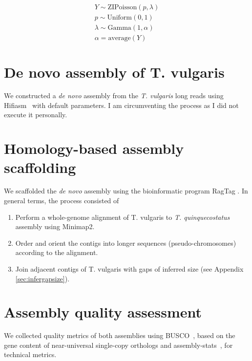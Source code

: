 \begin{subequations}
\label{eq:model}
\begin{align}
Y \sim \textrm{ZIPoisson}(p, \lambda) \label{eq:model1}\\
p \sim \textrm{Uniform}(0, 1) \label{eq:model2}\\
\lambda \sim \textrm{Gamma}(1, \alpha)  \label{eq:model3}\\
\alpha = \textrm{average}(Y) \label{eq:model4}
\end{align}   
\end{subequations}


\section{De novo assembly of T. vulgaris}\label{sec:denovo}

We constructed a \textit{de novo} assembly from the \textit{T. vulgaris} long reads using Hifiasm~\cite{chengHaplotyperesolvedNovoAssembly2021} with default parameters. I am circumventing the process as I did not execute it personally.
        
\section{Homology-based assembly scaffolding}\label{sec:scaffold}

We scaffolded the \textit{de novo} assembly using the bioinformatic program RagTag \cite{alongeAutomatedAssemblyScaffolding2022}. In general terms, the process consisted of 
\begin{enumerate}
    \item Perform a whole-genome alignment of T. vulgaris to \textit{T. quinquecostatus} assembly using Minimap2. 
    \item Order and orient the contigs into longer sequences (pseudo-chromosomes) according to the alignment. 
    \item Join adjacent contigs of T. vulgaris with gaps of inferred size (see Appendix \autoref{sec:infergapsize}). 
\end{enumerate}

\section{Assembly quality assessment}

We collected quality metrics of both assemblies using BUSCO~\cite{manniBUSCOAssessingGenomic2021}, based on the gene content of near-universal single-copy orthologs and assembly-stats~\cite{Assemblystats2023}, for technical metrics. 

